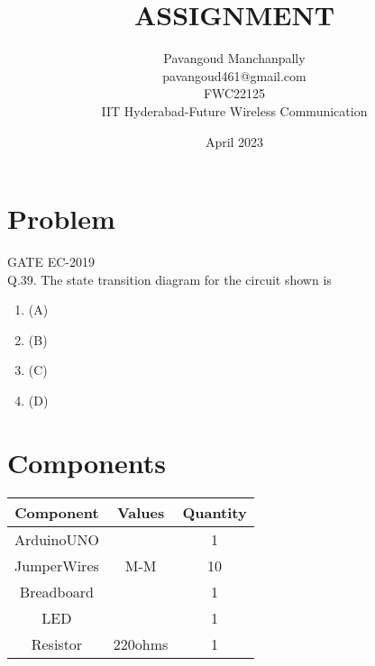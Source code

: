\documentclass{article}
\title{ASSIGNMENT}
\date{April 2023}
\author{Pavangoud Manchanpally \\pavangoud461@gmail.com\\FWC22125\\IIT Hyderabad-Future Wireless Communication }
\begin{document}
\maketitle
 \tableofcontents

 \pagebreak
\section{Problem}
 {GATE EC-2019}\\
 Q.39. The state transition diagram for the circuit shown is
\begin{figure}[h]
	 \centering
	 
\end{figure}

\begin{enumerate}
\item{(A)}
        \begin{figure}[h]
	        \centering
	        
        \end{figure}
\pagebreak
\item{(B)}
        \begin{figure}[h]
         	\centering
	        
        \end{figure}
\item{(C)}
	\begin{figure}[h]
		\centering
		
	\end{figure}
\item{(D)}
	\begin{figure}[h]
		\centering
		
	\end{figure}
\end{enumerate}
\pagebreak
\section{Components}
 \begin{table}[h]
  \centering
   \begin{tabular}{|c|c|c|}
   \hline
   \textbf{Component}& \textbf{Values} & \textbf{Quantity}\\
\hline
ArduinoUNO &  & 1 \\  
\hline
JumperWires& M-M & 10 \\ 
\hline
Breadboard &  & 1 \\
\hline
LED & &1 \\
\hline
Resistor &220ohms & 1\\
\hline
   \end{tabular}
   \end{table}
\end{document}
